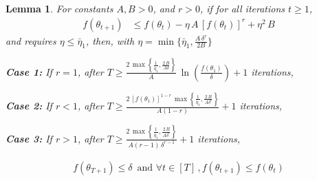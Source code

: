 \documentclass{article}
\newtheorem{lemma}{Lemma}
\newcommand{\tht}{\theta_t}
\newcommand{\thtt}{\theta_{t+1}}
\begin{document}
\begin{lemma}
For constants $A, B > 0$, and $r > 0$,  if for all iterations $t \geq 1$, 
\begin{align*}
f(\thtt) & \leq f(\tht) - \eta \, A \, [f(\tht)]^{r} + \eta^2 \, B 
\end{align*}
and requires $\eta \leq \bar{\eta}_1$, then, with $\eta = \min\{\bar{\eta}_1, \frac{A \, \delta^r}{2B} \}$

\textbf{Case 1:} If $r = 1$, after $T \geq \frac{2 \, \max\left\{\frac{1}{\bar{\eta}_1}, \frac{2 \, B}{A \delta}\right\}}{A} \, \ln\left(\frac{f(\theta_1)}{\delta}\right) + 1$ iterations, 

\textbf{Case 2:} If $r < 1$, after $T \geq \frac{2 \, [f(\theta_1)]^{1-r} \, \max\left\{\frac{1}{\bar{\eta}_1}, \frac{2 \, B}{A \delta^r}\right\}}{A (1-r)} + 1$ iterations, 

\textbf{Case 3:} If $r > 1$, after $T \geq \frac{2 \, \max\left\{\frac{1}{\bar{\eta}_1}, \frac{2 \, B}{A \delta^r}\right\}}{A (r-1) \, \delta^{r-1}} + 1$ iterations, 


\begin{align}
f(\theta_{T+1}) \leq \delta \, \text{ and } \forall t \in [T] \,, f(\thtt) \leq f(\tht)
\end{align}
\label{lemma:sd-p2}
\end{lemma}
\end{document}
